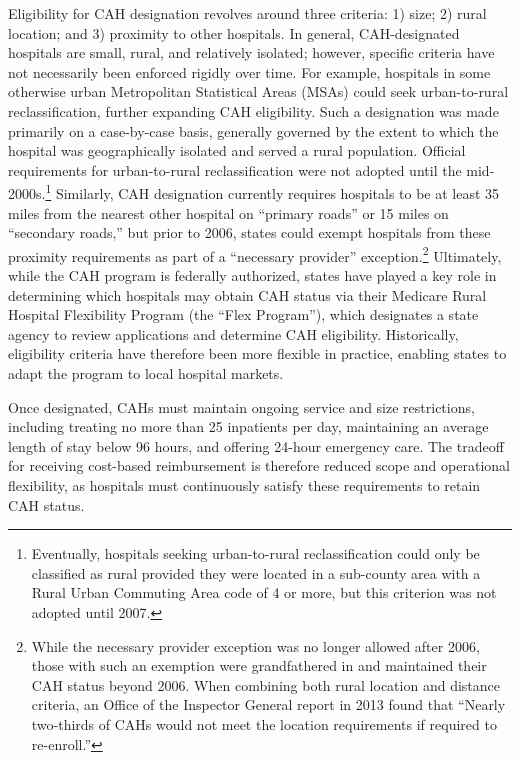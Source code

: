 \documentclass[a4paper, 12pt, twoside]{article}
\begin{document}
Eligibility for CAH designation revolves around three criteria: 1) size; 2) rural location; and 3) proximity to other hospitals. In general, CAH-designated hospitals are small, rural, and relatively isolated; however, specific criteria have not necessarily been enforced rigidly over time. For example, hospitals in some otherwise urban Metropolitan Statistical Areas (MSAs) could seek urban-to-rural reclassification, further expanding CAH eligibility. Such a designation was made primarily on a case-by-case basis, generally governed by the extent to which the hospital was geographically isolated and served a rural population. Official requirements for urban-to-rural reclassification were not adopted until the mid-2000s.\footnote{Eventually, hospitals seeking urban-to-rural reclassification could only be classified as rural provided they were located in a sub-county area with a Rural Urban Commuting Area code of 4 or more, but this criterion was not adopted until 2007.} Similarly, CAH designation currently requires hospitals to be at least 35 miles from the nearest other hospital on ``primary roads'' or 15 miles on ``secondary roads,'' but prior to 2006, states could exempt hospitals from these proximity requirements as part of a ``necessary provider'' exception.\footnote{While the necessary provider exception was no longer allowed after 2006, those with such an exemption were grandfathered in and maintained their CAH status beyond 2006. When combining both rural location and distance criteria, an Office of the Inspector General report in 2013 found that ``Nearly two-thirds of CAHs would not meet the location requirements if required to re-enroll.''} Ultimately, while the CAH program is federally authorized, states have played a key role in determining which hospitals may obtain CAH status via their Medicare Rural Hospital Flexibility Program (the ``Flex Program''), which designates a state agency to review applications and determine CAH eligibility. Historically, eligibility criteria have therefore been more flexible in practice, enabling states to adapt the program to local hospital markets.

Once designated, CAHs must maintain ongoing service and size restrictions, including treating no more than 25 inpatients per day, maintaining an average length of stay below 96 hours, and offering 24-hour emergency care. The tradeoff for receiving cost-based reimbursement is therefore reduced scope and operational flexibility, as hospitals must continuously satisfy these requirements to retain CAH status.
\end{document}
